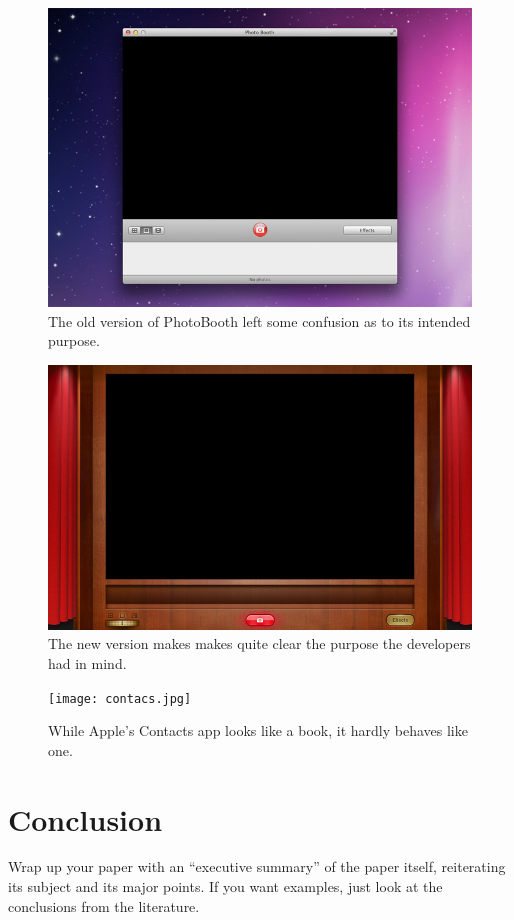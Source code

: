\documentclass{article}
\begin{document}
\begin{figure}
\centering
\includegraphics [width=5in]{photoBoothOldSmall.jpg}
\caption{The old version of PhotoBooth left some confusion as to its intended purpose.}
\label{Old Photo Booth}
\end{figure}

\begin{figure}
\centering
\includegraphics[width=5in]{photoboothFullscreenSmall.jpg}
\caption{The new version makes makes quite clear the purpose the developers had in mind.}
\label{New Photo Booth}
\end{figure}

\begin{figure}
\centering
\texttt{[image: contacs.jpg]}
\caption{While Apple's Contacts app looks like a book, it hardly behaves like one.}
\label{Contacts}
\end{figure}



\section{Conclusion}

Wrap up your paper with an ``executive summary'' of the paper itself, reiterating its subject and its major points.  If you want examples, just look at the conclusions from the literature.



\end{document}
